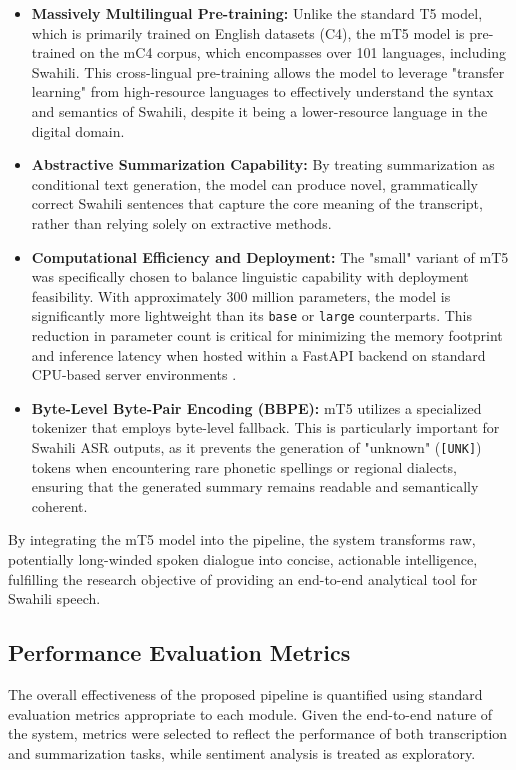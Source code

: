 \begin{itemize}
    \item \textbf{Massively Multilingual Pre-training:} Unlike the standard T5 model, which is primarily trained on English datasets (C4), the mT5 model is pre-trained on the mC4 corpus, which encompasses over 101 languages, including Swahili. This cross-lingual pre-training allows the model to leverage "transfer learning" from high-resource languages to effectively understand the syntax and semantics of Swahili, despite it being a lower-resource language in the digital domain.
    
    \item \textbf{Abstractive Summarization Capability:} By treating summarization as conditional text generation, the model can produce novel, grammatically correct Swahili sentences that capture the core meaning of the transcript, rather than relying solely on extractive methods.
    
    \item \textbf{Computational Efficiency and Deployment:} The "small" variant of mT5 was specifically chosen to balance linguistic capability with deployment feasibility. With approximately 300 million parameters, the model is significantly more lightweight than its \texttt{base} or \texttt{large} counterparts. This reduction in parameter count is critical for minimizing the memory footprint and inference latency when hosted within a FastAPI backend on standard CPU-based server environments \citep{DHAHBI2025100615}.
    
    \item \textbf{Byte-Level Byte-Pair Encoding (BBPE):} mT5 utilizes a specialized tokenizer that employs byte-level fallback. This is particularly important for Swahili ASR outputs, as it prevents the generation of "unknown" (\texttt{[UNK]}) tokens when encountering rare phonetic spellings or regional dialects, ensuring that the generated summary remains readable and semantically coherent.
\end{itemize}

By integrating the mT5 model into the pipeline, the system transforms raw, potentially long-winded spoken dialogue into concise, actionable intelligence, fulfilling the research objective of providing an end-to-end analytical tool for Swahili speech.

\subsection{Performance Evaluation Metrics}
The overall effectiveness of the proposed pipeline is quantified using standard evaluation metrics appropriate to each module. Given the end-to-end nature of the system, metrics were selected to reflect the performance of both transcription and summarization tasks, while sentiment analysis is treated as exploratory.

